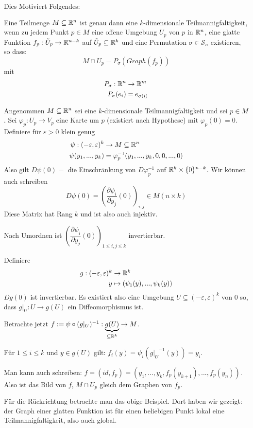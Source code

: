 \documentclass[main.tex]{subfiles}
\begin{document}
Dies Motiviert Folgendes:

\begin{Theorem}
  Eine Teilmenge $M \subseteq \mathbb{R}^n$ ist genau dann eine $k$-dimensionale Teilmannigfaltigkeit, wenn zu jedem Punkt $p \in M$ eine offene Umgebung $U_p$ von $p$ in $\mathbb{R}^n$, eine glatte Funktion $f_p: \tilde{U}_p \to \mathbb{R}^{n-k}$ auf $\tilde{U}_p \subseteq \mathbb{R}^k$ und eine Permutation $\sigma \in \mathcal{S}_n$ existieren, so dass:
  $$M \cap U_p = P_\sigma(Graph(f_p))$$
  mit $$\begin{aligned}
    P_\sigma : \mathbb{R}^n & \to \mathbb{R}^m \\
    P_\sigma(e_i) & = e_{\sigma(i)}
  \end{aligned}$$
\end{Theorem}

\begin{Beweis}
  Angenommen $M \subseteq \mathbb{R}^n$ sei eine $k$-dimensionale Teilmannigfaltigkeit und sei $p \in M$. Sei $\varphi_p: U_p \to V_p$ eine Karte um $p$ (existiert nach Hypothese) mit $\varphi_p(0) = 0$. Definiere für $\varepsilon >0$ klein genug
  $$\begin{aligned}
    \psi: (-\varepsilon,\varepsilon)^k & \to M \subseteq \mathbb{R}^n \\
    \psi(y_1,...,y_k) & = \varphi_p^{-1}(y_1,...,y_k, 0, 0, ..., 0)
  \end{aligned}$$
  Also gilt $D\psi (0) = $ die Einschränkung von $D \varphi_p^{-1}$ auf $\mathbb{R}^k \times \{0\}^{n-k}$. Wir können auch schreiben
  $$D\psi (0) = \left(\dfrac{\partial \psi_i}{\partial y_j}(0)\right)_{i,j} \in M(n \times k)$$
  Diese Matrix hat Rang $k$ und ist also auch injektiv.

  Nach Umordnen ist $\left(\dfrac{\partial \psi_i}{\partial y_j}(0)\right)_{1 \leq i,j \leq k}$ invertierbar.

  Definiere
  $$\begin{aligned}
    g: (-\varepsilon,\varepsilon)^k & \to \mathbb{R}^k \\
    y & \mapsto (\psi_1(y),...,\psi_k(y))
  \end{aligned}$$
  $Dg(0)$ ist invertierbar. Es existiert also eine Umgebung $U \subseteq (- \varepsilon,\varepsilon)^k$ von $0$ so, dass $g|_U : U \to g(U)$ ein Diffeomorphismus ist.

  Betrachte jetzt $f := \psi \circ (g|_U)^{-1} : \underbrace{g(U)}_{\subseteq \mathbb{R}^k} \to M$.

  Für $1 \leq i \leq k$ und $y \in g(U)$ gilt: $f_i(y) = \psi_i({g|_U}^{-1}(y)) = y_i$.

  Man kann auch schreiben: $f = (id,f_p) = (y_1,...,y_k,f_p(y_{k+1}),...,f_p(y_n))$. Also ist das Bild von $f$, $M \cap U_p$ gleich dem Graphen von $f_p$.

  Für die Rückrichtung betrachte man das obige Beispiel. Dort haben wir gezeigt: der Graph einer glatten Funktion ist für einen beliebigen Punkt lokal eine Teilmannigfaltigkeit, also auch global.
\end{Beweis}
\end{document}
